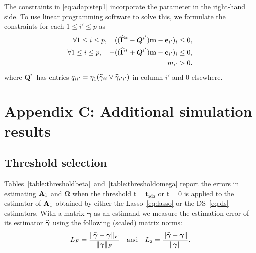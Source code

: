 The constraints in \eqref{eq:adap:step1} incorporate the parameter in the right-hand side.
To use linear programming software to solve this, we formulate the constraints for each $1\le i' \le p$ as
\begin{align*}
\forall 1\le i\le p, \quad ( (\widehat{\bm\Gamma}^* - \bm Q^{i'}) \mathbf m - \mathbf e_{i'})_i \le   0,\\
\forall 1\le i\le p, \quad -( (\widehat{\bm\Gamma}^* + \bm Q^{i'}) \mathbf m - \mathbf e_{i'})_i \le 0,\\
  m_{i'} > 0.
\end{align*}
where $\bm Q^{i'}$ has entries $q_{ii'} = \eta_1 (\widehat{\gamma}_{ii} \vee \widehat{\gamma}_{i'i'})$ in column $i'$ and $0$ elsewhere.

\section{Appendix C: Additional simulation results}
\label{sec:appendix:sim}

\subsection{Threshold selection}

Tables~\ref{table:thresholdbeta}~and~\ref{table:thresholdomega} report the errors in estimating $\mathbf A_1$ and $\bm\Omega$ when the threshold $\mathfrak{t} = \mathfrak{t}_{\text{ada}}$ or $\mathfrak{t} = 0$ is applied to the estimator of $\mathbf A_1$ obtained by either the Lasso~\eqref{eq:lasso} or the DS~\eqref{eq:ds} estimators. 
With a matrix $\bm\gamma$ as an estimand
we measure the estimation error of its estimator $\widehat{\bm\gamma}$
using the following (scaled) matrix norms:
\begin{align*}
L_F = \frac{\Vert \widehat{\bm\gamma} - \bm\gamma \Vert_F}{\Vert \bm\gamma \Vert_F} \quad \text{and} \quad L_2 = \frac{\Vert \widehat{\bm\gamma} - \bm\gamma \Vert}{\Vert \bm\gamma \Vert}.
\end{align*}

